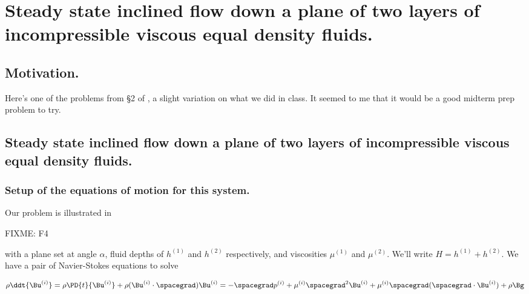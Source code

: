 
%


\chapter{Steady state inclined flow down a plane of two layers of incompressible viscous equal density fluids.}
\label{chap:twoLayerInclinedFlow}
{}
\date{Mar 1, 2012}

\beginArtWithToc

\section{Motivation.}

Here's one of the problems from \S 2 of \cite{acheson1990elementary}, a slight variation on what we did in class.  It seemed to me that it would be a good midterm prep problem to try.

\section{Steady state inclined flow down a plane of two layers of incompressible viscous equal density fluids.}

\subsection{Setup of the equations of motion for this system.}

Our problem is illustrated in 

FIXME: F4

with a plane set at angle $\alpha$, fluid depths of $h^{(1)}$ and $h^{(2)}$ respectively, and viscosities $\mu^{(1)}$ and $\mu^{(2)}$.  We'll write $H = h^{(1)} + h^{(2)}$.  We have a pair of Navier-Stokes equations to solve

\begin{equation}\label{eqn:twoLayerInclinedFlow:10}
\rho \ddt{\Bu^{(i)}} = \rho \PD{t}{\Bu^{(i)}} + \rho (\Bu^{(i)} \cdot \spacegrad) \Bu^{(i)} = - \spacegrad p^{(i)} + \mu^{(i)} \spacegrad^2 \Bu^{(i)} + \mu^{(i)} \spacegrad (\spacegrad \cdot \Bu^{(i)}) + \rho \Bg
\end{equation}

